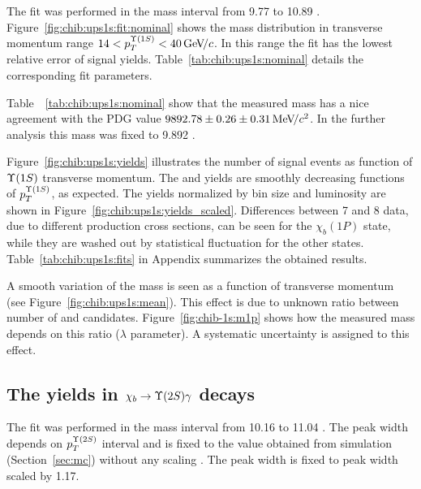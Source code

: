 The fit was performed in the mass interval from  9.77 \gevcc to 10.89 \gevcc.
Figure~\ref{fig:chib:ups1s:fit:nominal} shows the mass distribution in transverse
momentum range $14 < p_T^{\OneS} < 40 \gevc$. In this range the fit has
the lowest relative error of signal yields. Table~\ref{tab:chib:ups1s:nominal}
details the corresponding fit parameters.




Table~~\ref{tab:chib:ups1s:nominal} show that the measured \chiboneOneP mass
has a  nice agreement with the PDG value $9892.78 \pm 0.26 \pm 0.31 {\mathrm{\,Me\kern -0.1em V\!/}c^2}$.
In the further analysis this mass was fixed to 9.892 \gevcc.

% 

Figure~\ref{fig:chib:ups1s:yields} illustrates the number of signal events as
function of $\Y1S$ transverse momentum. The \chibOneP and \chibThreeP yields
are smoothly decreasing functions of $p_T^{\Y1S}$, as expected. The yields
normalized by bin size and luminosity are shown in
Figure~\ref{fig:chib:ups1s:yields_scaled}. Differences between 7 and 8 \tev
data, due to different production cross sections, can be seen for the
$\chi_b(1P)$ state, while they are washed out by statistical fluctuation for
the other states. Table~\ref{tab:chib:ups1s:fits} in Appendix summarizes the
obtained results.



A smooth variation of the \chiboneOneP mass is seen as a function of transverse
momentum (see Figure~\ref{fig:chib:ups1s:mean}). This effect is due to unknown
ratio between number of \chiboneOneP and \chiboneTwoP candidates.
Figure~\ref{fig:chib-1s:m1p} shows how the measured mass depends on this ratio
($\lambda$ parameter). A systematic uncertainty is assigned to this effect.





\subsection{The \texorpdfstring{\chib}{chib} yields in
	\texorpdfstring{$\chib \to \Y2S \gamma$}{chib --> Y(2S) gamma} decays}
\label{sec:chib:ups2s:fit}

The fit was performed in the mass interval from 10.16 \gevcc to 11.04 \gevcc.
The  \chiboneTwoP peak width depends on $p_T^{\Y2S}$ interval and is fixed to
the value obtained from simulation (Section~\ref{sec:mc}) without any scaling .
The \chiboneThreeP peak width is fixed to \chiboneTwoP peak width scaled by
1.17.


